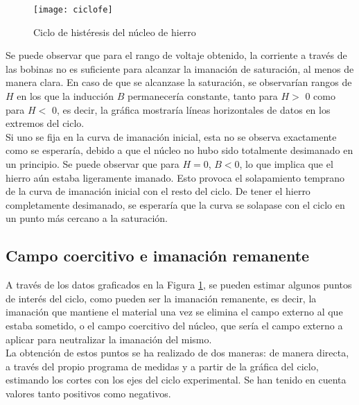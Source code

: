 \documentclass[fleqn,11pt]{SelfArx} %
\begin{document}
\begin{figure}[ht!]\centering
	\texttt{[image: ciclofe]}
	\caption{Ciclo de histéresis del núcleo de hierro}
	\label{fig:primerciclo}
\end{figure}

Se puede observar que para el rango de voltaje obtenido, la corriente a través de las bobinas no es suficiente para alcanzar la imanación de saturación, al menos de manera clara. En caso de que se alcanzase la saturación, se observarían rangos de $H$ en los que la inducción $B$ permanecería constante, tanto para $H >$ 0 como para $H <$ 0, es decir, la gráfica mostraría líneas horizontales de datos en los extremos del ciclo. \\

Si uno se fija en la curva de imanación inicial, esta no se observa exactamente como se esperaría, debido a que el núcleo no hubo sido totalmente desimanado en un principio. Se puede observar que para $H = 0$, $B < 0$, lo que implica que el hierro aún estaba ligeramente imanado. Esto provoca el solapamiento temprano de la curva de imanación inicial con el resto del ciclo. De tener el hierro completamente desimanado, se esperaría que la curva se solapase con el ciclo en un punto más cercano a la saturación.

\subsection{Campo coercitivo e imanación remanente}

A través de los datos graficados en la Figura \ref{fig:primerciclo}, se pueden estimar algunos puntos de interés del ciclo, como pueden ser la imanación remanente, es decir, la imanación que mantiene el material una vez se elimina el campo externo al que estaba sometido, o el campo coercitivo del núcleo, que sería el campo externo a aplicar para neutralizar la imanación del mismo. \\

La obtención de estos puntos se ha realizado de dos maneras: de manera directa, a través del propio programa de medidas y a partir de la gráfica del ciclo, estimando los cortes con los ejes del ciclo experimental. Se han tenido en cuenta valores tanto positivos como negativos. 
\end{document}
